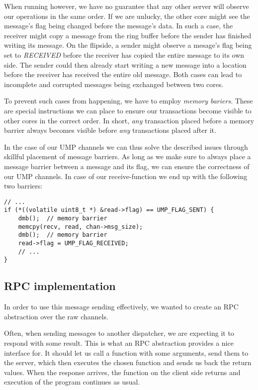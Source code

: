 When running however, we have no guarantee that any other server will observe our operations in the same order. If we are unlucky, the other core might see the message's flag being changed before the message's data. In such a case, the receiver might copy a message from the ring buffer before the sender has finished writing its message. On the flipside, a sender might observe a mesage's flag being set to \emph{RECEIVED} before the receiver has copied the entire message to its own side. The sender could then already start writing a new message into a location before the receiver has received the entire old message. Both cases can lead to incomplete and corrupted messages being exchanged between two cores.

To prevent such cases from happening, we have to employ \emph{memory bariers}. These are special instructions we can place to ensure our transactions become visible to other cores in the correct order. In short, \emph{any} transaction placed before a memory barrier always becomes visible before \emph{any} transactions placed after it.

In the case of our UMP channels we can thus solve the described issues through skillful placement of message barriers. As long as we make sure to always place a message barrier between a message and its flag, we can ensure the correctness of our UMP channels. In case of our receive-function we end up with the following two barriers:
\begin{mdframed}[style=myframe]
\begin{verbatim}
// ...
if (*((volatile uint8_t *) &read->flag) == UMP_FLAG_SENT) {
    dmb();  // memory barrier
    memcpy(recv, read, chan->msg_size);
    dmb();  // memory barrier
    read->flag = UMP_FLAG_RECEIVED;
    // ...
}
\end{verbatim}
\end{mdframed}

\subsection{RPC implementation}
In order to use this message sending effectively, we wanted to create an RPC abstraction over the raw channels.

Often, when sending messages to another dispatcher, we are expecting it to respond with some result.
This is what an RPC abstraction provides a nice interface for. It should let us call a function
with some arguments, send them to the server, which then executes the chosen function and sends us back
the return values. When the response arrives, the function on the client side returns and execution of the program continues as usual.

